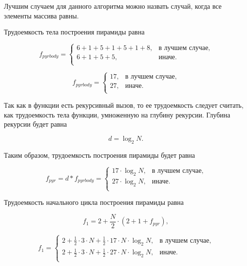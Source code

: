 Лучшим случаем для данного алгоритма можно назвать случай, когда все элементы массива равны.

Трудоемкость тела построения пирамиды равна

\begin{equation}
	f_{pyr body} = \begin{cases}
		6 + 1 + 5 + 1 + 5 + 1 + 8, & \text{в лучшем случае}, \\
		6 + 1 + 5 + 5, & \text{иначе}. \\
	\end{cases}
\end{equation}

\begin{equation}
	f_{pyr body} = \begin{cases}
		17, & \text{в лучшем случае}, \\
		27, & \text{иначе}. \\
	\end{cases}
\end{equation}

Так как в функции есть рекурсивный вызов, то ее трудоемкость следует считать, как трудоемкость тела функции, умноженную на глубину рекурсии. Глубина рекурсии будет равна

\begin{equation}
	d = \log_2 N.
\end{equation}

Таким образом, трудоемкость построения пирамиды будет равна

\begin{equation}
	f_{pyr} = d * f_{pyr body} = \begin{cases}
		17 \cdot \log_2 N, & \text{в лучшем случае}, \\
		27 \cdot \log_2 N, & \text{иначе}. \\
	\end{cases}
\end{equation}

Трудоемкость начального цикла построения пирамиды равна

\begin{equation}
	f_1 = 2 + \frac{N}{2} \cdot (2 + 1 + f_{pyr}),
\end{equation}

\begin{equation}
	f_1 = \begin{cases}
		2 + \frac{1}{2} \cdot 3 \cdot N + \frac{1}{2} \cdot 17 \cdot N \cdot \log_2 N, & \text{в лучшем случае}, \\
		2 + \frac{1}{2} \cdot 3 \cdot N + \frac{1}{2} \cdot 27 \cdot N \cdot \log_2 N, & \text{иначе}. \\
	\end{cases}
\end{equation}

